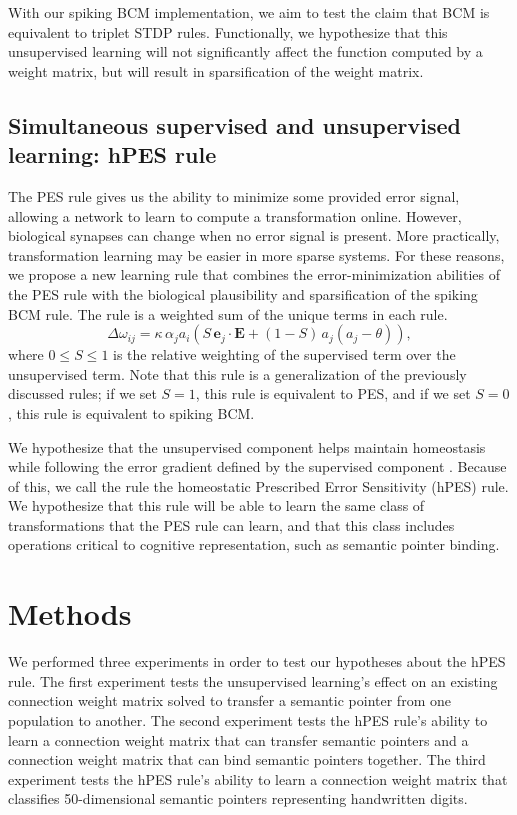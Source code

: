 \documentclass[10pt,letterpaper]{article}
\begin{document}
With our spiking BCM implementation,
we aim to test the claim that BCM is equivalent
to triplet STDP rules.
Functionally, we hypothesize that
this unsupervised learning
will not significantly affect the function
computed by a weight matrix,
but will result in sparsification
of the weight matrix.

\subsection{Simultaneous supervised and unsupervised learning: hPES rule}

The PES rule gives us the ability to
minimize some provided error signal,
allowing a network to
learn to compute a transformation online.
However, biological synapses can change
when no error signal is present.
More practically,
transformation learning may be easier
in more sparse systems.
For these reasons, we propose a new learning rule
that combines the error-minimization abilities of the PES rule
with the biological plausibility and sparsification
of the spiking BCM rule.
The rule is a weighted sum of the
unique terms in each rule.
\begin{equation} \label{eq:hpes}
	\Delta \omega_{ij} = \kappa \, \alpha_j a_i \left(
    S \, \mathbf{e}_j \cdot \mathbf{E} + (1 - S) \, a_j(a_j - \theta) \right),
\end{equation}
where $0 \le S \le 1$ is the relative weighting of
the supervised term over the unsupervised term.
Note that this rule is a generalization
of the previously discussed rules;
if we set $S = 1$,
this rule is equivalent to PES, and
if we set $S = 0$,
this rule is equivalent to spiking BCM.

We hypothesize that the unsupervised
component helps maintain homeostasis
while following the error gradient defined
by the supervised component	.
Because of this, we call the rule
the homeostatic Prescribed Error Sensitivity (hPES) rule.
We hypothesize that this rule will
be able to learn the same class
of transformations that the PES rule can learn,
and that this class includes operations
critical to cognitive representation,
such as semantic pointer binding.

\section{Methods}

We performed three experiments in order to
test our hypotheses about the hPES rule.
The first experiment tests the unsupervised learning's
effect on an existing connection weight matrix
solved to transfer a semantic pointer
from one population to another.
The second experiment tests the hPES rule's
ability to learn a connection weight matrix
that can transfer semantic pointers
and a connection weight matrix
that can bind semantic pointers together.
The third experiment tests the hPES
rule's ability to learn a connection weight matrix
that classifies 50-dimensional semantic pointers
representing handwritten digits.
\end{document}
